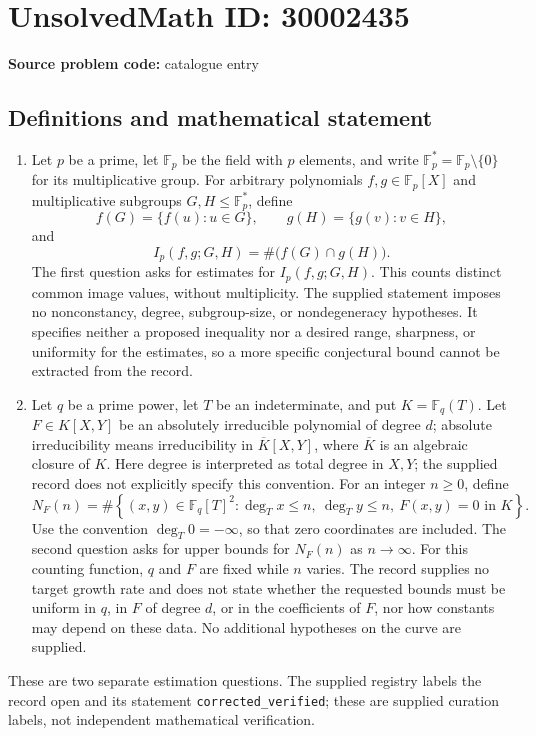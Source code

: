 \documentclass[11pt]{article}
\begin{document}
\section*{UnsolvedMath ID: 30002435}
\textbf{Source problem code:} catalogue entry
\subsection{Definitions and mathematical statement}
\begin{enumerate}
\item Let \(p\) be a prime, let \(\mathbb F_p\) be the field with \(p\) elements, and write \(\mathbb F_p^*=\mathbb F_p\setminus\{0\}\) for its multiplicative group. For arbitrary polynomials \(f,g\in\mathbb F_p[X]\) and multiplicative subgroups \(G,H\leq\mathbb F_p^*\), define
\[
f(G)=\{f(u):u\in G\},\qquad g(H)=\{g(v):v\in H\},
\]
and
\[
I_p(f,g;G,H)=\#\bigl(f(G)\cap g(H)\bigr).
\]
The first question asks for estimates for \(I_p(f,g;G,H)\). This counts distinct common image values, without multiplicity. The supplied statement imposes no nonconstancy, degree, subgroup-size, or nondegeneracy hypotheses. It specifies neither a proposed inequality nor a desired range, sharpness, or uniformity for the estimates, so a more specific conjectural bound cannot be extracted from the record.

\item Let \(q\) be a prime power, let \(T\) be an indeterminate, and put \(K=\mathbb F_q(T)\). Let \(F\in K[X,Y]\) be an absolutely irreducible polynomial of degree \(d\); absolute irreducibility means irreducibility in \(\overline K[X,Y]\), where \(\overline K\) is an algebraic closure of \(K\). Here degree is interpreted as total degree in \(X,Y\); the supplied record does not explicitly specify this convention. For an integer \(n\geq0\), define
\[
N_F(n)=\#\left\{(x,y)\in\mathbb F_q[T]^2:
\deg_T x\leq n,\ \deg_T y\leq n,\ F(x,y)=0\text{ in }K\right\}.
\]
Use the convention \(\deg_T0=-\infty\), so that zero coordinates are included. The second question asks for upper bounds for \(N_F(n)\) as \(n\to\infty\). For this counting function, \(q\) and \(F\) are fixed while \(n\) varies. The record supplies no target growth rate and does not state whether the requested bounds must be uniform in \(q\), in \(F\) of degree \(d\), or in the coefficients of \(F\), nor how constants may depend on these data. No additional hypotheses on the curve are supplied.
\end{enumerate}
These are two separate estimation questions. The supplied registry labels the record open and its statement \texttt{corrected\_verified}; these are supplied curation labels, not independent mathematical verification.
\end{document}
